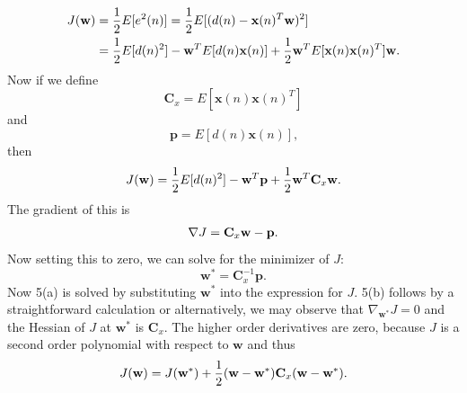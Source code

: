 \begin{enumerate}
\begin{solution}
    \begin{align*}
      J({\bf{w}})&=\frac{1}{2}E[e^2(n)]=\frac{1}{2}E[(d(n)-\mathbf{x}(n)^T{\bf{w}})^2] \\
      &=
      \frac{1}{2} E[d(n)^2] - {\bf{w}}^T E[ d(n) \mathbf{x}(n)  ]  + 
      \frac{1}{2} {\bf{w}}^T E[\textbf{x}(n) \textbf{x}(n)^T ] {\bf{w}} \mbox{.}
    \end{align*}
    Now if we define 
    \begin{equation*}
      \textbf{C}_x = E[\textbf{x}(n) \textbf{x}(n)^T ]
    \end{equation*}
    and
    \begin{equation*}
      \textbf{p} = E[d(n) \textbf{x}(n) ] \mbox{,}
    \end{equation*}
    then
    \begin{align*}
      J({\bf{w}}) = \frac{1}{2} E[d(n)^2] - {\bf{w}}^T \textbf{p}  + 
      \frac{1}{2} {\bf{w}}^T \textbf{C}_x {\bf{w}} \mbox{.}
    \end{align*}
    The gradient of this is
    \begin{align*}
      \nabla J =   \textbf{C}_x {\bf{w}} - \textbf{p} \mbox{.}
    \end{align*}
    Now setting this to zero, we can solve for the minimizer of $J$:
    \begin{equation*}
      \textbf{w}^* = \textbf{C}_x^{-1} \textbf{p} \mbox{.}
    \end{equation*}
    Now 5(a) is solved by substituting $\textbf{w}^*$ into the expression for $J$.
    5(b) follows by a straightforward calculation or alternatively, we may observe
    that $\nabla_{\textbf{w}^*} J = 0$ and the Hessian of $J$ at $\textbf{w}^*$ is $\textbf{C}_x$.
    The higher order derivatives are zero, because $J$ is a second order polynomial with respect
    to $\textbf{w}$ and thus
    \begin{equation*}
      J({\bf{w}}) = J( \textbf{w}^* ) + \frac{1}{2} ( {\bf{w}} - \textbf{w}^* ) \textbf{C}_x ( {\bf{w}} - \textbf{w}^* ) \mbox{.}
    \end{equation*}

  \end{solution}
  
\end{enumerate}


